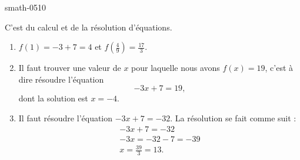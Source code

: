 
\begin{corrige}{smath-0510}

    C'est du calcul et de la résolution d'équations.
    \begin{enumerate}
        \item
            \( f(1)=-3+7=4\) et \( f(\frac{ 4 }{ 9 })=\frac{ 17 }{ 3 }\).
        \item
            Il faut trouver une valeur de \( x\) pour laquelle nous avons \( f(x)=19\), c'est à dire résoudre l'équation
            \begin{equation}
                -3x+7=19,
            \end{equation}
            dont la solution est \( x=-4\).
        \item
            Il faut résoudre l'équation \( -3x+7=-32\). La résolution se fait comme suit :
            \begin{subequations}
                \begin{align}
                    -3x+7=-32\\
                    -3x=-32-7=-39\\
                    x=\frac{ 39 }{ 3 }=13.
                \end{align}
            \end{subequations}
            
    \end{enumerate}

\end{corrige}
